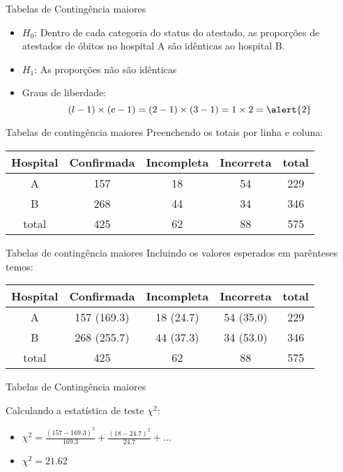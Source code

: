 \documentclass{beamer}
\begin{document}
\begin{frame}{Tabelas de Contingência maiores}
  \begin{itemize}
  \item $H_0$: Dentro de cada categoria do status do atestado, as
    proporções de atestados de óbitos no hospital A são idênticas ao
    hospital B.
  \item $H_1$: As proporções não são idênticas
  \item Graus de liberdade: 
    \begin{displaymath}
      (l -1)\times (c-1) = (2-1) \times (3-1)
      = 1 \times 2 = \alert{2}
    \end{displaymath}
  \end{itemize}
\end{frame}

\begin{frame}{Tabelas de contingência maiores}
  Preenchendo os totais por linha e coluna:
  \begin{example}
    \begin{tabular}{c|c|c|c|c}
      Hospital & Confirmada & Incompleta &
      Incorreta & total\\
      \hline
      A & 157 & 18 & 54 & 229\\
      \hline
      B & 268 & 44 & 34 & 346\\
      \hline
      total & 425 & 62 & 88 & 575\\
    \end{tabular}
  \end{example}
\end{frame}

\begin{frame}{Tabelas de contingência maiores}
  Incluindo os valores esperados em parênteses temos:
  \begin{example}
    \begin{tabular}{c|c|c|c|c}
      Hospital & Confirmada & Incompleta &
      Incorreta & total\\
      \hline
      A & 157 (169.3) & 18 (24.7) & 54 (35.0) & 229\\
      \hline
      B & 268 (255.7) & 44 (37.3) & 34 (53.0) & 346\\
      \hline
      total & 425 & 62 & 88 & 575\\
    \end{tabular}
  \end{example}
\end{frame}

\begin{frame}{Tabelas de Contingência maiores}

  Calculando a estatística de teste $\chi^2$:

  \begin{itemize}
  \item $\chi^2 = \frac{(157 - 169.3)^2}{169.3} +
  \frac{(18-24.7)^2}{24.7}  + \ldots$
\item $\chi^2 = 21.62$
\end{itemize}
\end{frame}
\end{document}
